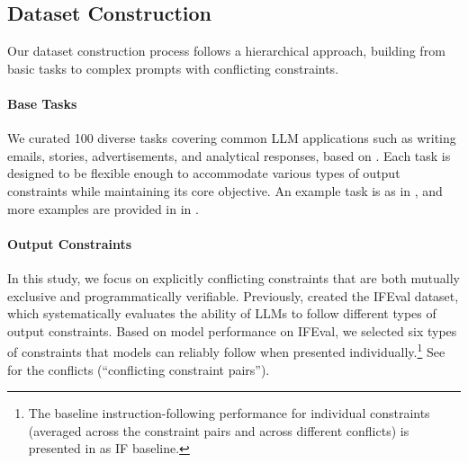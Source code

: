\subsection{Dataset Construction}\label{sec:dataset}
Our dataset construction process follows a hierarchical approach, building from basic tasks to complex prompts with conflicting constraints.


\paragraph{Base Tasks} We curated 100 diverse tasks covering common LLM applications such as writing emails, stories, advertisements, and analytical responses, based on \citet{zhou2023instruction}. Each task is designed to be flexible enough to accommodate various types of output constraints while maintaining its core objective. An example task is  as in , and more examples are provided in  in .

\paragraph{Output Constraints} In this study, we focus on explicitly conflicting constraints that are both mutually exclusive and programmatically verifiable. Previously, \citet{zhou2023instruction} created the IFEval dataset, which systematically evaluates the ability of LLMs to follow different types of output constraints. Based on model performance on IFEval, we selected six types of constraints that models can reliably follow when presented individually.\footnote{The baseline instruction-following performance for individual constraints (averaged across the constraint pairs and across different conflicts) is presented in  as IF baseline.} 
See  for the conflicts (``conflicting constraint pairs'').

